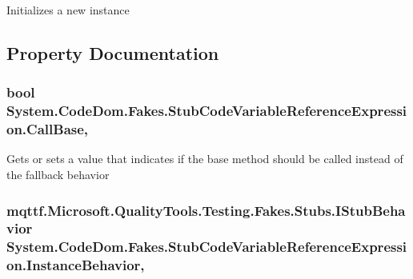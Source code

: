 Initializes a new instance



\subsection{Property Documentation}
\hypertarget{class_system_1_1_code_dom_1_1_fakes_1_1_stub_code_variable_reference_expression_a2d7cee4b1179f4f94818ba7c4121f671}{
\subsubsection[{Call\-Base}]{\setlength{\rightskip}{0pt plus 5cm}bool System.\-Code\-Dom.\-Fakes.\-Stub\-Code\-Variable\-Reference\-Expression.\-Call\-Base\hspace{0.3cm}{\ttfamily [get]}, {\ttfamily [set]}}}\label{class_system_1_1_code_dom_1_1_fakes_1_1_stub_code_variable_reference_expression_a2d7cee4b1179f4f94818ba7c4121f671}


Gets or sets a value that indicates if the base method should be called instead of the fallback behavior

\hypertarget{class_system_1_1_code_dom_1_1_fakes_1_1_stub_code_variable_reference_expression_a2e0704c064a204caa4ae56f7b3376400}{
\subsubsection[{Instance\-Behavior}]{\setlength{\rightskip}{0pt plus 5cm}mqttf.\-Microsoft.\-Quality\-Tools.\-Testing.\-Fakes.\-Stubs.\-I\-Stub\-Behavior System.\-Code\-Dom.\-Fakes.\-Stub\-Code\-Variable\-Reference\-Expression.\-Instance\-Behavior\hspace{0.3cm}{\ttfamily [get]}, {\ttfamily [set]}}}\label{class_system_1_1_code_dom_1_1_fakes_1_1_stub_code_variable_reference_expression_a2e0704c064a204caa4ae56f7b3376400}


